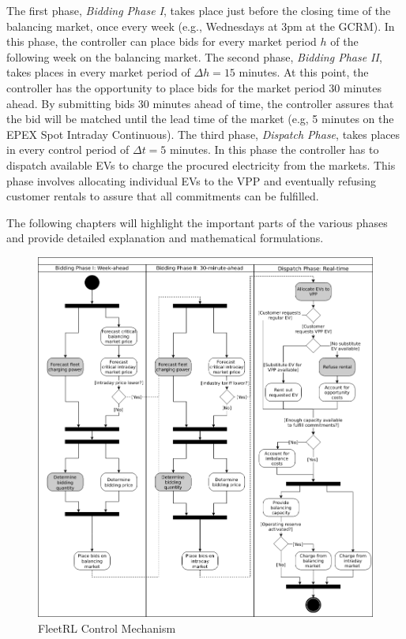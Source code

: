 \documentclass[a4paper, 12pt]{article}
\begin{document}
The first phase, \emph{Bidding Phase I}, takes place just before the closing time of
the balancing market, once every week (e.g., Wednesdays at 3pm at the GCRM). In
this phase, the controller can place bids for every market period \(h\) of the
following week on the balancing market. The second phase, \emph{Bidding Phase II},
takes places in every market period of \(\Delta{h}\!=\!15\) minutes. At this
point, the controller has the opportunity to place bids for the market period 30
minutes ahead. By submitting bids 30 minutes ahead of time, the controller
assures that the bid will be matched until the lead time of the market (e.g, 5
minutes on the EPEX Spot Intraday Continuous). The third phase, \emph{Dispatch
Phase}, takes places in every control period of \(\Delta{t}\!=\!5\) minutes. In
this phase the controller has to dispatch available EVs to charge the procured
electricity from the markets. This phase involves allocating individual EVs to
the VPP and eventually refusing customer rentals to assure that all commitments
can be fulfilled.

The following chapters will highlight the important parts of the various phases
and provide detailed explanation and mathematical formulations.

\begin{figure}[p]
\centering
\includegraphics[width=1.05\linewidth]{./fig/control_mechanism.png}
\caption[FleetRL Control Mechanism]{FleetRL Control Mechanism \label{fig-control-mechanism}}
\end{figure}
\end{document}
